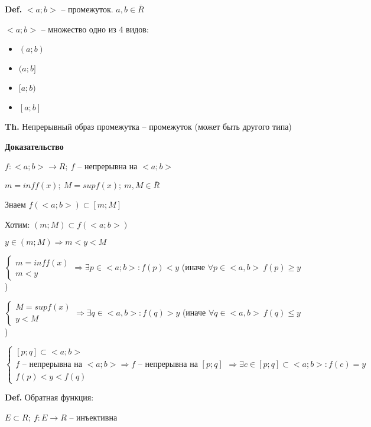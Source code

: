 \documentclass[14pt, letter paper]{article}
\begin{document}
\vspace{5mm}

\textbf{Def.} $<a; b>$ -- промежуток. $a, b \in \overline{R}$

$<a; b>$ -- множество одно из 4 видов:

\begin{itemize}
    \item $(a; b)$ 
    \item $(a; b]$
    \item $[a; b)$
    \item $[a; b]$
\end{itemize}

\textbf{Th.} Непрерывный образ промежутка -- промежуток (может быть другого типа)

\begin{center}
    \textbf{Доказательство}
\end{center}

$f : <a; b> \rightarrow R;\ f$ -- непрерывна на $<a;b>$

$m = inff(x);\ M = supf(x);\ m, M \in \overline{R}$

Знаем $f(<a;b>) \subset [m; M]$

Хотим: $(m; M) \subset f(<a; b>)$

$y \in (m; M) \Rightarrow m < y < M$

$\begin{cases}
    m = inff(x) \\
    m < y
\end{cases} \Rightarrow \exists p \in <a; b> : f(p) < y$ (иначе $\forall p \in <a, b>\ f(p) \geq y$)

$\begin{cases}
    M = supf(x) \\
    y < M
\end{cases} \Rightarrow \exists q \in <a, b> : f(q) > y$ (иначе $\forall q \in <a, b>\ f(q) \leq y$)

$\begin{cases}
    [p; q] \subset <a;b> \\
    f \text{ -- непрерывна на } <a; b> \Rightarrow f \text{ -- непрерывна на } [p; q] \\
    f(p) < y < f(q)
\end{cases} \Rightarrow \exists c \in [p; q] \subset <a;b> : f(c) = y$

\vspace{5mm}

\textbf{Def.} Обратная функция:

$E \subset R;\ f : E \rightarrow R$ -- инъективна
\end{document}

